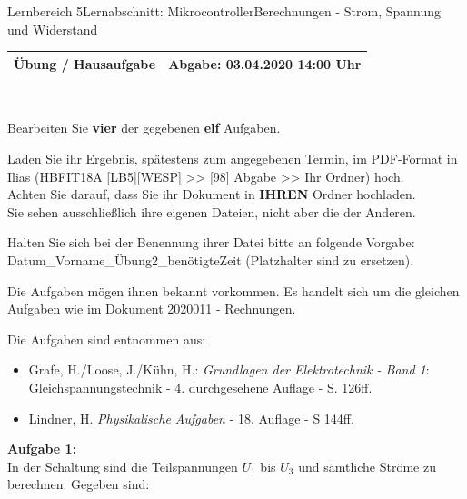 \documentclass[oneside,openany,headings=optiontotoc,11pt,numbers=noenddot]{scrreprt}
\begin{document}
		\begin{worksheet}{Lernbereich 5}{Lernabschnitt: Mikrocontroller}{Berechnungen - Strom, Spannung und Widerstand}
			\begin{framed}
				\noindent
				\begin{tabularx}{0.98\textwidth}{Xr}
					\textbf{Übung / Hausaufgabe} & Abgabe: 03.04.2020 14:00 Uhr\\
					\hline
				\end{tabularx}\\
				\par\noindent
				Bearbeiten Sie \textbf{vier} der gegebenen \textbf{elf} Aufgaben.\\
				\par\noindent
				Laden Sie ihr Ergebnis, spätestens zum angegebenen Termin, im PDF-Format in Ilias (HBFIT18A [LB5][WESP] >> [98] Abgabe >> Ihr Ordner) hoch.\\
				Achten Sie darauf, dass Sie ihr Dokument in \textbf{IHREN} Ordner hochladen.\\
				Sie sehen ausschließlich ihre eigenen Dateien, nicht aber die der Anderen.\\
				\par\noindent
				Halten Sie sich bei der Benennung ihrer Datei bitte an folgende Vorgabe: Datum\_Vorname\_Übung2\_benötigteZeit (Platzhalter sind zu ersetzen).\\
				\par\bigskip\noindent
				\small{Die Aufgaben mögen ihnen bekannt vorkommen. Es handelt sich um die gleichen Aufgaben wie im Dokument 2020011 - Rechnungen.}\normalsize
			\end{framed}
			\begin{framed}
				\noindent
				\tiny{Die Aufgaben sind entnommen aus:
					\begin{itemize}
						\item Grafe, H./Loose, J./Kühn, H.: \textit{Grundlagen der Elektrotechnik - Band 1}: Gleichspannungstechnik - 4. durchgesehene Auflage - S. 126ff.
						\item Lindner, H. \textit{Physikalische Aufgaben} - 18. Auflage - S 144ff.
					\end{itemize}}\normalsize
				\textbf{Aufgabe 1:}\\
				In der Schaltung sind die Teilspannungen \(U_1\) bis \(U_3\) und sämtliche Ströme zu berechnen. Gegeben sind:\\
				\begin{minipage}[c]{0.48\textwidth}

\end{minipage}
\end{framed}
\end{worksheet}
\end{document}
